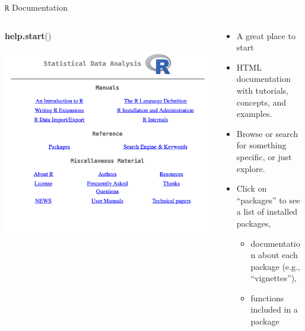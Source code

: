 \documentclass[
  11pt,
  ignorenonframetext,
]{beamer}
\newenvironment{Shaded}{\begin{snugshade}}{\end{snugshade}}
\newcommand{\FunctionTok}[1]{\textcolor[rgb]{0.13,0.29,0.53}{\textbf{#1}}}
\newcommand{\NormalTok}[1]{#1}
\providecommand{\tightlist}{%
  \setlength{\itemsep}{0pt}\setlength{\parskip}{0pt}}
\newlength\ShadedFrameSep
\begin{document}
\begin{frame}[fragile]{\(\texttt{R}\) Documentation}
\protect\hypertarget{textttr-documentation}{}
\begin{columns}[t,onlytextwidth]
\begin{column}{0.45\textwidth}
\begin{Shaded}
\begin{Highlighting}[]
\FunctionTok{help.start}\NormalTok{()}
\end{Highlighting}
\end{Shaded}

\includegraphics{images/R-screenshot-help-start}
\end{column}

\begin{column}{0.5\textwidth}
\vspace{\ShadedFrameSep}{}

\begin{itemize}
\tightlist
\item
  A great place to start
\item
  HTML documentation with tutorials, concepts, and examples.
\item
  Browse or search for something specific, or just explore.
\item
  Click on ``packages'' to see a list of installed packages,

  \begin{itemize}
  \tightlist
  \item
    documentation about each package (e.g., ``vignettes''),
  \item
    functions included in a package
  \end{itemize}
\end{itemize}
\end{column}
\end{columns}
\end{frame}
\end{document}
